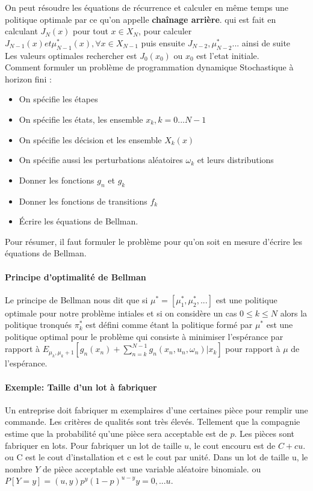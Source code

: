 \documentclass[oneside]{book}
\begin{document}
On peut résoudre les équations de récurrence et calculer en même temps une politique optimale par ce qu'on appelle \textbf{chaînage arrière}. qui est fait en calculant $J_N(x)$ pour tout $x \in X_N$,   pour calculer $J_{N-1}(x) et \mu^*_{N-1}(x), \forall x \in X_{N-1}$ puis ensuite $J_{N-2}, \mu^*_{N-2}$... ainsi de suite\\

Les valeurs optimales rechercher est $J_0(x_0)$ ou $x_0$ est l'etat initiale.\\

Comment formuler un problème de programmation dynamique Stochastique à horizon fini :\\

\begin{itemize}
\item On spécifie les étapes
\item On spécifie les états, les ensemble $x_k, k=0...N-1$
\item On spécifie les décision et les ensemble $X_k(x)$
\item On spécifie aussi les perturbations aléatoires $\omega_k$ et leurs distributions
\item Donner les fonctions $g_n$ et $g_k$
\item Donner les fonctions de transitions $f_k$
\item Écrire les équations de Bellman.
\end{itemize}

Pour résumer, il faut formuler le problème pour qu'on soit en mesure d'écrire les équations de Bellman. 

\paragraph{Principe d'optimalité de Bellman}
Le principe de Bellman nous dit que si $\mu^* = [\mu^*_1, \mu^*_2,...]$ est une politique optimale pour notre problème intiales et si on considère un cas $0 \leq k \leq N$ alors la politique tronqués $\pi^*_k$ est défini comme étant la politique formé par $\mu^*$ est une politique optimal pour le problème qui consiste à minimiser l'espérance par rapport à $E_{\mu_k, \mu_k+1}[g_n(x_n) + \sum\limits_{n=k}^{N-1}g_n(x_n, u_n, \omega_n) | x_k]$ pour rapport à $\mu$ de l'espérance.\\

\paragraph{Exemple: Taille d'un lot à fabriquer}
Un entreprise doit fabriquer m exemplaires d'une certaines pièce pour remplir une commande. Les critères de qualités sont très élevés. Tellement que la compagnie estime que la probabilité qu'une pièce sera acceptable est de $p$. Les pièces sont fabriquer en lots. Pour fabriquer un lot de taille $u$, le cout encouru est de $C+ cu$. ou C est le cout d'installation et c est le cout par unité. Dans un lot de taille u, le nombre $Y$ de pièce acceptable est une variable aléatoire binomiale. ou $P[Y=y] = (u,y) p^y(1-p)^{u-y} y=0,...u$.\\
\end{document}
